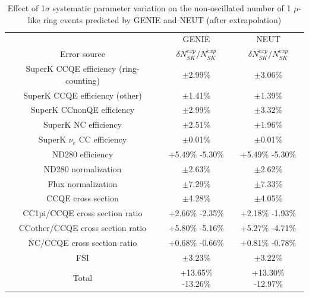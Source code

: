 \begin{table}[htb]
\center
\renewcommand{\arraystretch}{1.75} %
\begin{tabular}{|c|c|c|}
\hline
       & GENIE & NEUT \\
Error source  &
  $\delta{N^{exp}_{SK}}/N^{exp}_{SK}$  &
  $\delta{N^{exp}_{SK}}/N^{exp}_{SK}$  \\
\hline
SuperK CCQE efficiency (ring-counting)  &   $\pm$2.99\%       &   $\pm$3.06\%       \\
SuperK CCQE efficiency (other)          &   $\pm$1.41\%       &   $\pm$1.39\%       \\
SuperK CCnonQE efficiency               &   $\pm$2.99\%       &   $\pm$3.32\%       \\
SuperK NC efficiency                    &   $\pm$2.51\%       &   $\pm$1.96\%       \\
SuperK $\nu_{e}$ CC efficiency          &   $\pm$0.01\%       &   $\pm$0.01\%       \\
ND280 efficiency                        &   +5.49\% -5.30\%   &   +5.49\% -5.30\%   \\
ND280 normalization                     &   $\pm$2.63\%       &   $\pm$2.62\%       \\
Flux normalization                      &   $\pm$7.29\%       &   $\pm$7.33\%       \\
CCQE cross section                      &   $\pm$4.28\%       &   $\pm$4.05\%       \\
CC1pi/CCQE cross section ratio          &   +2.66\% -2.35\%   &   +2.18\% -1.93\%   \\
CCother/CCQE cross section ratio        &   +5.80\% -5.16\%   &   +5.27\% -4.71\%   \\ 
NC/CCQE cross section ratio             &   +0.68\% -0.66\%   &   +0.81\% -0.78\%   \\
FSI                                     &   $\pm$3.23\%       &   $\pm$3.22\%       \\
\hline
Total                                   &   +13.65\% -13.26\% &   +13.30\% -12.97\% \\
\hline
\end{tabular}\\[2pt]
\caption{
  Effect of 1$\sigma$ systematic parameter variation on the non-oscillated number of 1 $\mu$-like ring events
  predicted by GENIE and NEUT (after extrapolation)
}
\label{table:dnsk_noosc}
\end{table}



